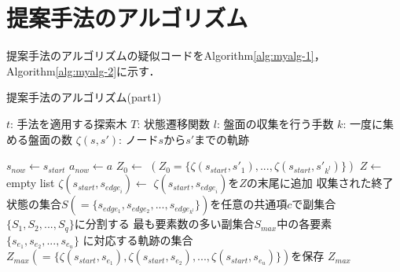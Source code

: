 \section{提案手法のアルゴリズム}
提案手法のアルゴリズムの疑似コードをAlgorithm\ref{alg:myalg-1}，Algorithm\ref{alg:myalg-2}に示す．
\begin{algorithm}
    
    \caption{提案手法のアルゴリズム(part1)}
    \label{alg:myalg-1}
    \begin{algorithmic}[1]
        \State $t$: 手法を適用する探索木
        \State $T$: 状態遷移関数
        \State $l$: 盤面の収集を行う手数
        \State $k$: 一度に集める盤面の数
        \State $\zeta(s, s')$: ノード$s$から$s'$までの軌跡
        
       
           \State $s_{now}\gets s_{start}$
           \State $a_{now}\gets a$
           \State $Z_0 \gets$
           \State $(Z_0 =\{\zeta(s_{start}, {s'}_1), ..., \zeta(s_{start}, {s'}_{k^l})\})$
           \State $ Z \gets$ empty list
             \State $\zeta(s_{start}, s_{{edge}_i}) \gets$ 
             \State $\zeta(s_{start}, s_{{edge}_i})$を$Z$の末尾に追加
           \EndFor
           \State 収集された終了状態の集合$S(=\{s_{edge_1},s_{edge_2}, ..., s_{edge_{k^l}}\})$を任意の共通項$c$で副集合$\{S_1, S_2, ..., S_q\}$に分割する
           \State 最も要素数の多い副集合$S_{max}$中の各要素$\{s_{e_1}, s_{e_2}, ...,  s_{e_u}\}$
           \State に対応する軌跡の集合$Z_{max}(=\{\zeta(s_{start}, s_{e_1}), \zeta(s_{start}, s_{e_2}), ..., \zeta(s_{start}, s_{e_u})\})$を保存
           \State \Return $Z_{max}$
        \EndFunction
    \end{algorithmic}
\end{algorithm}
